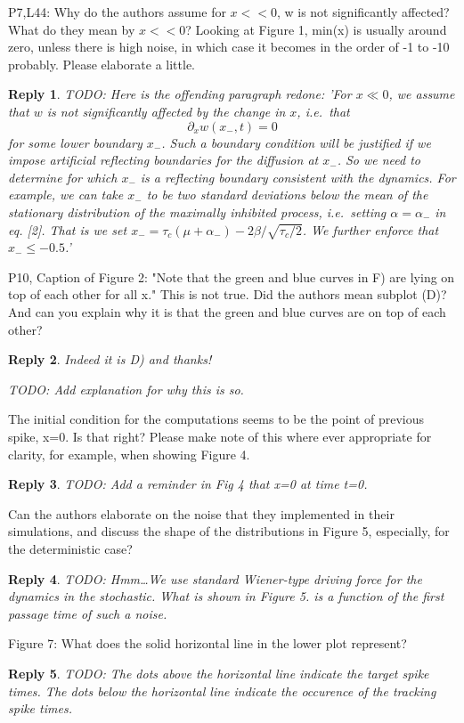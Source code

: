\documentclass{article}
\newtheorem*{rep}{Reply}
\begin{document}
P7,L44: Why do the authors assume for $x<<0$, w is not significantly affected?
What do they mean by $x<<0$? Looking at Figure 1, min(x) is usually around zero,
unless there is high noise, in which case it becomes in the order of -1 to -10
probably. Please elaborate a little.
\begin{rep}
TODO: Here is the offending paragraph redone:
 \def \xmin {{ x_{-}}}
  \def \amin {{ \alpha_{-}}}
  \def \tc {{ \tau_c}}
 'For $x \ll 0$, we assume that $w$ is not
significantly affected by the change in $x$, i.e.\ that $$ \partial_x
w(x_{-}, t) = 0 $$ for some lower boundary $x_{-}$. Such a boundary condition will be
justified if we impose artificial reflecting boundaries for the diffusion at
$\xmin$. So we need to determine for which $\xmin$ is a reflecting boundary
consistent with the dynamics. For example, we can take $\xmin$ to be two
standard deviations below the mean of the stationary distribution of the
maximally inhibited process, i.e.\ setting $\alpha=\amin$ in eq. [2].
 That is we set $\xmin = \tc(\mu + \amin) - 2 \beta /
\sqrt{\tc/2}$. We further enforce that $\xmin \leq -0.5$.'
\end{rep}

P10, Caption of Figure 2: "Note that the green and blue curves in F) are lying
on top of each other for all x." This is not true. Did the authors mean subplot
(D)? And can you explain why it is that the green and blue curves are on top of
each other?
\begin{rep}
 Indeed it is D) and thanks!

TODO: Add explanation for why this is so.
\end{rep}

The initial condition for the computations seems to be the point of previous
spike, x=0. Is that right? Please make note of this where ever appropriate for
clarity, for example, when showing Figure 4.
\begin{rep}
TODO: Add a reminder in Fig 4 that x=0 at time t=0.
\end{rep}

Can the authors elaborate on the noise that they implemented in their
simulations, and discuss the shape of the distributions in Figure 5, especially,
for the deterministic case?
\begin{rep}
TODO: Hmm\ldots We use standard Wiener-type driving force for the dynamics in
the stochastic. What is shown in Figure 5. is a function of the first passage
time of such a noise. 
\end{rep}
Figure 7: What does the solid horizontal line in the lower plot represent?
\begin{rep}
TODO: The dots above the horizontal line indicate the target spike times. The
dots below the horizontal line indicate the occurence of the tracking spike
times. 
\end{rep}
\end{document}
